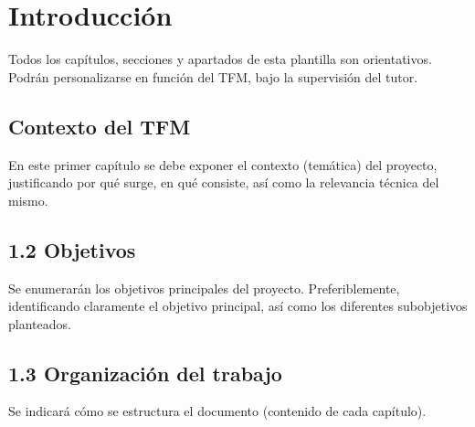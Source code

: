 \vspace*{-1cm}
\section{Introducción}
\label{sec:introduccion}

Todos los capítulos, secciones y apartados de esta plantilla son orientativos. Podrán personalizarse en función del TFM, bajo la supervisión del tutor. 

\subsection{Contexto del TFM}
En este primer capítulo se debe exponer el contexto (temática) del proyecto, justificando por qué surge, en qué consiste, así como la relevancia técnica del mismo.

\subsection{1.2	Objetivos}
Se enumerarán los objetivos principales del proyecto. Preferiblemente, identificando claramente el objetivo principal, así como los diferentes subobjetivos planteados.

\subsection{1.3	Organización del trabajo}
Se indicará cómo se estructura el documento (contenido de cada capítulo).

